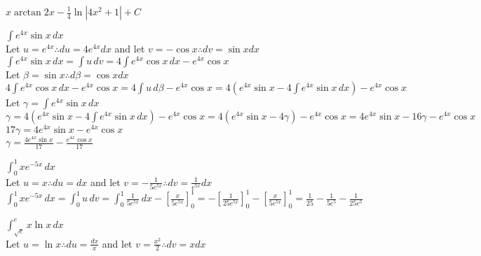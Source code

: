 \documentclass[10pt, letterpaper]{report}
\begin{document}
\begin{enumerate}
{    $x\arctan{2x}-\frac{1}{4}\ln{|4x^{2}+1|}+C$ \\

  \item{$\int{e^{4x}\sin{x}}\,dx$} \\

    Let $u=e^{4x}\therefore du=4e^{4x}dx$ and let $v=-\cos{x}\therefore dv=\sin{x}dx$ \\

    $\int{e^{4x}\sin{x}}\,dx=\int{u}\,dv=4\int{e^{4x}\cos{x}}\,dx-e^{4x}\cos{x}$ \\

    Let $\beta=\sin{x}\therefore d\beta=\cos{x}dx$ \\

    $4\int{e^{4x}\cos{x}}\,dx-e^{4x}\cos{x}=4\int{u}\,d\beta-e^{4x}\cos{x}=
    4\left(e^{4x}\sin{x}-4\int{e^{4x}\sin{x}}\,dx\right)-e^{4x}\cos{x}$ \\

    Let $\gamma=\int{e^{4x}\sin{x}}\,dx$ \\

    $\gamma=4\left(e^{4x}\sin{x}-4\int{e^{4x}\sin{x}}\,dx\right)-e^{4x}\cos{x}=
    4\left(e^{4x}\sin{x}-4\gamma\right)-e^{4x}\cos{x}=
    4e^{4x}\sin{x}-16\gamma-e^{4x}\cos{x}$ \\

    $17\gamma=4e^{4x}\sin{x}-e^{4x}\cos{x}$ \\

    $\gamma=\frac{4e^{4x}\sin{x}}{17}-\frac{e^{4x}\cos{x}}{17}$ \\

  \item{$\int_{0}^{1}{xe^{-5x}}\,dx$} \\

    Let $u=x\therefore du=dx$ and let $v=-\frac{1}{5e^{5x}}\therefore dv=\frac{1}{e^{5x}}dx$ \\

    $\int_{0}^{1}{xe^{-5x}}\,dx=\int_{0}^{1}{u}\,dv=
    \int_{0}^{1}{\frac{1}{5e^{5x}}}\,dx-[\frac{x}{5e^{5x}}]_{0}^{1}=
    -[\frac{1}{25e^{5x}}]_{0}^{1}-[\frac{x}{5e^{5x}}]_{0}^{1}=
    \frac{1}{25}-\frac{1}{5e^{5}}-\frac{1}{25e^{5}}$ \\

  \item{$\int_{\sqrt{e}}^{e}{x\ln{x}}\,dx$} \\

    Let $u=\ln{x}\therefore du=\frac{dx}{x}$ and let $v=\frac{x^{2}}{2}\therefore dv=xdx$ \\

}
\end{enumerate}
\end{document}
